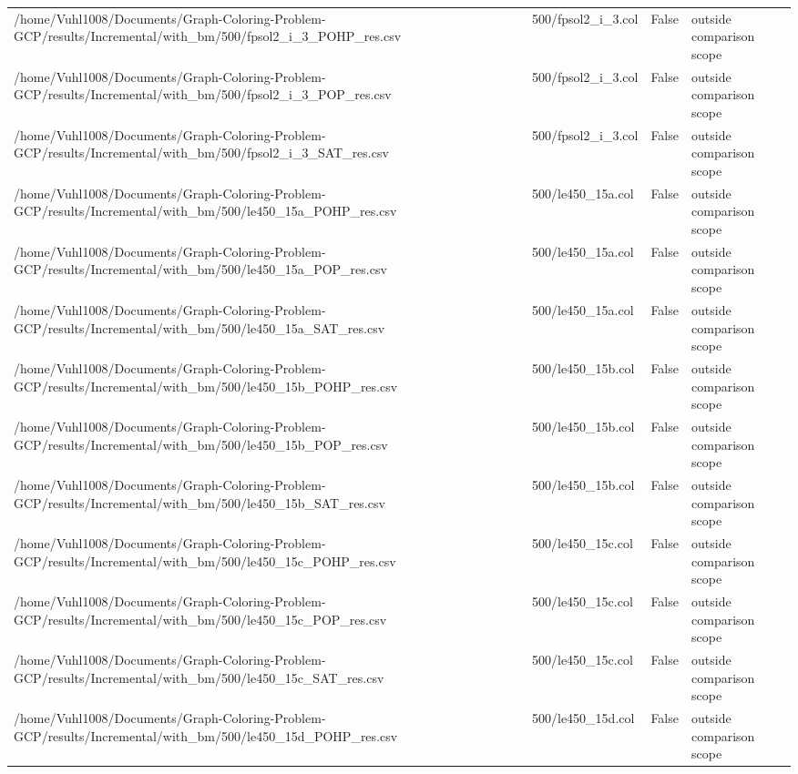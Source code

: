 \begin{table}[htbp]
\begin{tabular}{llll}
/home/Vuhl1008/Documents/Graph-Coloring-Problem-GCP/results/Incremental/with\_bm/500/fpsol2\_i\_3\_POHP\_res.csv & 500/fpsol2\_i\_3.col & False & outside comparison scope \\
/home/Vuhl1008/Documents/Graph-Coloring-Problem-GCP/results/Incremental/with\_bm/500/fpsol2\_i\_3\_POP\_res.csv & 500/fpsol2\_i\_3.col & False & outside comparison scope \\
/home/Vuhl1008/Documents/Graph-Coloring-Problem-GCP/results/Incremental/with\_bm/500/fpsol2\_i\_3\_SAT\_res.csv & 500/fpsol2\_i\_3.col & False & outside comparison scope \\
/home/Vuhl1008/Documents/Graph-Coloring-Problem-GCP/results/Incremental/with\_bm/500/le450\_15a\_POHP\_res.csv & 500/le450\_15a.col & False & outside comparison scope \\
/home/Vuhl1008/Documents/Graph-Coloring-Problem-GCP/results/Incremental/with\_bm/500/le450\_15a\_POP\_res.csv & 500/le450\_15a.col & False & outside comparison scope \\
/home/Vuhl1008/Documents/Graph-Coloring-Problem-GCP/results/Incremental/with\_bm/500/le450\_15a\_SAT\_res.csv & 500/le450\_15a.col & False & outside comparison scope \\
/home/Vuhl1008/Documents/Graph-Coloring-Problem-GCP/results/Incremental/with\_bm/500/le450\_15b\_POHP\_res.csv & 500/le450\_15b.col & False & outside comparison scope \\
/home/Vuhl1008/Documents/Graph-Coloring-Problem-GCP/results/Incremental/with\_bm/500/le450\_15b\_POP\_res.csv & 500/le450\_15b.col & False & outside comparison scope \\
/home/Vuhl1008/Documents/Graph-Coloring-Problem-GCP/results/Incremental/with\_bm/500/le450\_15b\_SAT\_res.csv & 500/le450\_15b.col & False & outside comparison scope \\
/home/Vuhl1008/Documents/Graph-Coloring-Problem-GCP/results/Incremental/with\_bm/500/le450\_15c\_POHP\_res.csv & 500/le450\_15c.col & False & outside comparison scope \\
/home/Vuhl1008/Documents/Graph-Coloring-Problem-GCP/results/Incremental/with\_bm/500/le450\_15c\_POP\_res.csv & 500/le450\_15c.col & False & outside comparison scope \\
/home/Vuhl1008/Documents/Graph-Coloring-Problem-GCP/results/Incremental/with\_bm/500/le450\_15c\_SAT\_res.csv & 500/le450\_15c.col & False & outside comparison scope \\
/home/Vuhl1008/Documents/Graph-Coloring-Problem-GCP/results/Incremental/with\_bm/500/le450\_15d\_POHP\_res.csv & 500/le450\_15d.col & False & outside comparison scope \\

\end{tabular}
\end{table}
